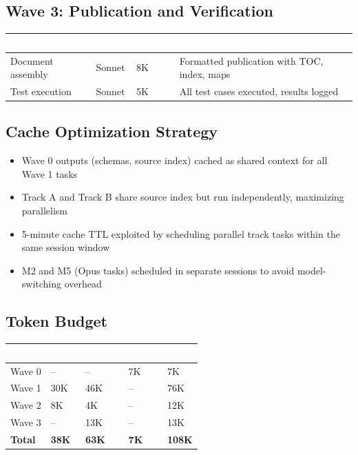 \documentclass[11pt,letterpaper]{article}
\newcommand{\tableheader}[1]{\textbf{\sffamily\textcolor{white}{#1}}}
\begin{document}
\subsection{Wave 3: Publication and Verification}

\begin{center}
\begin{tabularx}{\textwidth}{L{3cm}L{2cm}C{1.5cm}X}
\toprule
{}
\tableheader{Task} & \tableheader{Model} & \tableheader{Tokens} & \tableheader{Output} \\
\midrule
Document assembly & Sonnet & 8K & Formatted publication with TOC, index, maps \\
Test execution & Sonnet & 5K & All test cases executed, results logged \\
\bottomrule
\end{tabularx}
\end{center}

\subsection{Cache Optimization Strategy}

\begin{itemize}[leftmargin=2em]
\item Wave 0 outputs (schemas, source index) cached as shared context for all Wave 1 tasks
\item Track A and Track B share source index but run independently, maximizing parallelism
\item 5-minute cache TTL exploited by scheduling parallel track tasks within the same session window
\item M2 and M5 (Opus tasks) scheduled in separate sessions to avoid model-switching overhead
\end{itemize}

\subsection{Token Budget}

\begin{center}
\begin{tabularx}{\textwidth}{L{3cm}C{2cm}C{2cm}C{2cm}C{2cm}}
\toprule
{}
\tableheader{Wave} & \tableheader{Opus} & \tableheader{Sonnet} & \tableheader{Haiku} & \tableheader{Total} \\
\midrule
Wave 0 & -- & -- & 7K & 7K \\
Wave 1 & 30K & 46K & -- & 76K \\
Wave 2 & 8K & 4K & -- & 12K \\
Wave 3 & -- & 13K & -- & 13K \\
\midrule
\textbf{Total} & \textbf{38K} & \textbf{63K} & \textbf{7K} & \textbf{108K} \\
\bottomrule
\end{tabularx}
\end{center}
\end{document}
